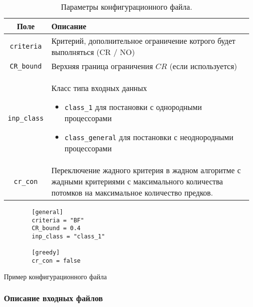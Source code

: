 \begin{table}[!htbp]
    \centering
    \begin{tabularx}{\textwidth}{|c|X|}
        \hline
        Поле                & Описание                                                                                                                                      \\
        \hline
        \texttt{criteria}   & Критерий, дополнительное ограничение котрого будет выполняться (CR / NO)                                                                      \\
        \hline
        \texttt{CR\_bound}  & Верхняя граница ограничения $CR$ (если используется)                                                                                          \\
        \hline
        \texttt{inp\_class} & Класс типа входных данных
        \begin{itemize}
            \item \texttt{class\_1} для постановки с однородными процессорами
            \item \texttt{class\_general} для постановки с неоднородными процессорами
        \end{itemize}                                                                                            \\
        \hline
        \texttt{cr\_con}    & Переключение жадного критерия в жадном алгоритме с жадными критериями с максимального количества потомков на максимальное количество предков. \\
        \hline
    \end{tabularx}
    \caption{Параметры конфигурационного файла.}
    \label{tbl:config-file-parameters}
\end{table}
\begin{listing}
    \begin{verbatim}
        [general] 
        criteria = "BF" 
        CR_bound = 0.4 
        inp_class = "class_1" 
        
        [greedy] 
        cr_con = false
    \end{verbatim}
    \caption{Пример конфигурационного файла}
    \label{lst:config-file}
\end{listing}

\subsubsection{Описание входных файлов}

